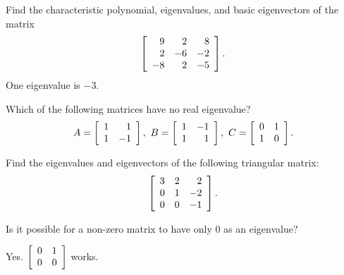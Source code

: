 \documentclass{ximera}
\begin{document}
\begin{exercise}
  Find the characteristic polynomial, eigenvalues, and basic
  eigenvectors of the matrix
  \begin{equation*}
    \startmat{rrr}
      9 & 2 & 8 \\
      2 & -6 & -2 \\
      -8 & 2 & -5 \\
    \stopmat.
  \end{equation*}
  One eigenvalue is $-3$.
\end{exercise}

\begin{exercise}
  Which of the following matrices have no real eigenvalue?
  \begin{equation*}
    A = \startmat{rr}
      1 & 1 \\
      1 & -1 \\
    \stopmat,
    \quad
    B = \startmat{rr}
      1 & -1 \\
      1 & 1 \\
    \stopmat,
    \quad
    C = \startmat{rr}
      0 & 1 \\
      1 & 0 \\
    \stopmat.
  \end{equation*}
\end{exercise}

\begin{exercise}
  Find the eigenvalues and eigenvectors of the following triangular
  matrix:
  \begin{equation*}
    \startmat{rrr}
      3 & 2 & 2 \\
      0 & 1 & -2 \\
      0 & 0 & -1 \\
    \stopmat.
  \end{equation*}
\end{exercise}

\begin{exercise}
  Is it possible for a non-zero matrix to have only $0$ as an eigenvalue?
  \vspace{1mm}
  \begin{solution}
    Yes. $\startmat{cc}
      0 & 1 \\
      0 & 0
    \stopmat$ works.
  \end{solution}
\end{exercise}
\end{document}

